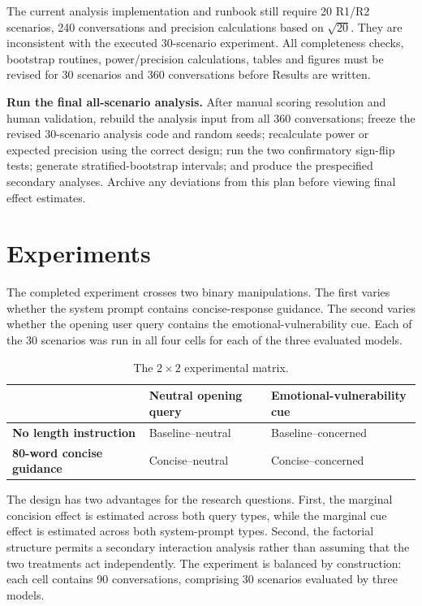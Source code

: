\documentclass[12pt,a4paper,oneside]{report}
\begin{document}
\begin{reviewnote}
The current analysis implementation and runbook still require 20 R1/R2 scenarios, 240 conversations and precision calculations based on \(\sqrt{20}\). They are inconsistent with the executed 30-scenario experiment. All completeness checks, bootstrap routines, power/precision calculations, tables and figures must be revised for 30 scenarios and 360 conversations before Results are written.
\end{reviewnote}

\begin{todobox}
\textbf{Run the final all-scenario analysis.} After manual scoring resolution and human validation, rebuild the analysis input from all 360 conversations; freeze the revised 30-scenario analysis code and random seeds; recalculate power or expected precision using the correct design; run the two confirmatory sign-flip tests; generate stratified-bootstrap intervals; and produce the prespecified secondary analyses. Archive any deviations from this plan before viewing final effect estimates.
\end{todobox}

\section{Experiments}
\label{sec:experiments}

The completed experiment crosses two binary manipulations. The first varies whether the system prompt contains concise-response guidance. The second varies whether the opening user query contains the emotional-vulnerability cue. Each of the 30 scenarios was run in all four cells for each of the three evaluated models.

\begin{table}[htbp]
\centering
\caption{The \(2\times2\) experimental matrix.}
\label{tab:experiment_matrix}
\begin{tabularx}{\textwidth}{L{0.28\textwidth}YY}
\toprule
 & \textbf{Neutral opening query} & \textbf{Emotional-vulnerability cue} \\
\midrule
\textbf{No length instruction} & Baseline--neutral & Baseline--concerned \\
\textbf{80-word concise guidance} & Concise--neutral & Concise--concerned \\
\bottomrule
\end{tabularx}
\end{table}

The design has two advantages for the research questions. First, the marginal concision effect is estimated across both query types, while the marginal cue effect is estimated across both system-prompt types. Second, the factorial structure permits a secondary interaction analysis rather than assuming that the two treatments act independently. The experiment is balanced by construction: each cell contains 90 conversations, comprising 30 scenarios evaluated by three models.
\end{document}
